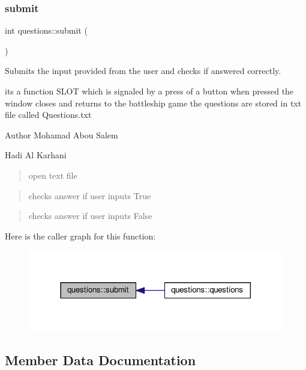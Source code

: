 \subsubsection{\texorpdfstring{submit}{submit}}
{\footnotesize\ttfamily int questions\+::submit (\begin{DoxyParamCaption}{ }\end{DoxyParamCaption})\hspace{0.3cm}{\ttfamily [slot]}}



Submits the input provided from the user and checks if answered correctly. 

its a function S\+L\+OT which is signaled by a press of a button when pressed the window closes and returns to the battleship game the questions are stored in txt file called Questions.\+txt

\begin{DoxyAuthor}{Author}
Mohamad Abou Salem 

Hadi Al Karhani 
\end{DoxyAuthor}
\begin{quote}
open text file \end{quote}


\begin{quote}
checks answer if user inputs True \end{quote}


\begin{quote}
checks answer if user inputs False \end{quote}
Here is the caller graph for this function\+:
\nopagebreak
\begin{figure}[H]
\begin{center}
\leavevmode
\includegraphics[width=317pt]{classquestions_a6425653b765e9a7bf937907c32b15e4b_icgraph}
\end{center}
\end{figure}


\subsection{Member Data Documentation}
\mbox{\label{classquestions_a4e309b0da41c63855fe645abe177ed19}} 
